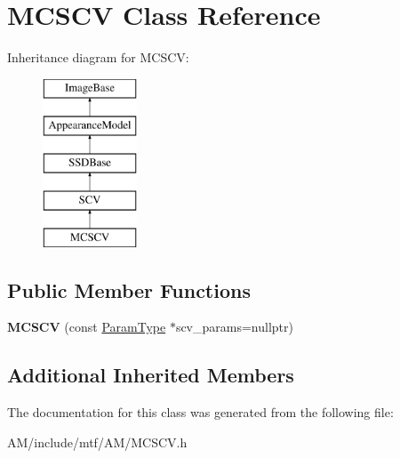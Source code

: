 \hypertarget{classMCSCV}{\section{M\-C\-S\-C\-V Class Reference}
\label{classMCSCV}
}
Inheritance diagram for M\-C\-S\-C\-V\-:\begin{figure}[H]
\begin{center}
\leavevmode
\includegraphics[height=5.000000cm]{classMCSCV}
\end{center}
\end{figure}
\subsection*{Public Member Functions}
\begin{DoxyCompactItemize}
\item 
\hypertarget{classMCSCV_a5f30e79898eb46f7be7242698515735f}{{\bfseries M\-C\-S\-C\-V} (const \hyperlink{structSCVParams}{Param\-Type} $\ast$scv\-\_\-params=nullptr)}\label{classMCSCV_a5f30e79898eb46f7be7242698515735f}

\end{DoxyCompactItemize}
\subsection*{Additional Inherited Members}


The documentation for this class was generated from the following file\-:\begin{DoxyCompactItemize}
\item 
A\-M/include/mtf/\-A\-M/M\-C\-S\-C\-V.\-h\end{DoxyCompactItemize}
